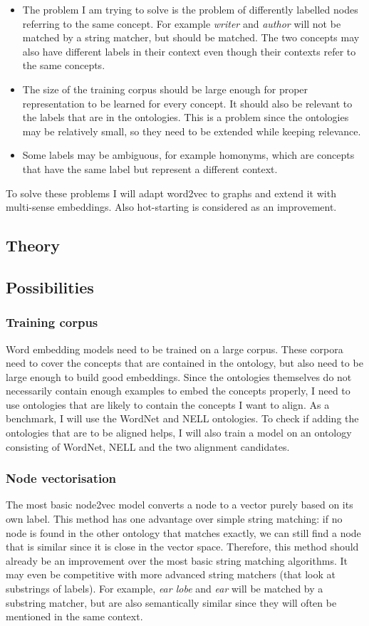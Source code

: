 \documentclass{article}
\begin{document}
 \begin{itemize}
  \item The problem I am trying to solve is the problem of differently labelled nodes referring to the same concept. For example \emph{writer} and \emph{author} will not be matched by a string matcher, but should be matched. The two concepts may also have different labels in their context even though their contexts refer to the same concepts.
  \item The size of the training corpus should be large enough for proper representation to be learned for every concept. It should also be relevant to the labels that are in the ontologies. This is a problem since the ontologies may be relatively small, so they need to be extended while keeping relevance.
  \item Some labels may be ambiguous, for example homonyms, which are concepts that have the same label but represent a different context.
 \end{itemize}
 
 To solve these problems I will adapt word2vec to graphs and extend it with multi-sense embeddings. Also hot-starting is considered as an improvement.
 
 \subsection{Theory}
 \subsection{Possibilities} %
  \subsubsection{Training corpus}
  Word embedding models need to be trained on a large corpus. These corpora need to cover the concepts that are contained in the ontology, but also need to be large enough to build good embeddings. Since the ontologies themselves do not necessarily contain enough examples to embed the concepts properly, I need to use ontologies that are likely to contain the concepts I want to align.
  As a benchmark, I will use the WordNet and NELL ontologies. To check if adding the ontologies that are to be aligned helps, I will also train a model on an ontology consisting of WordNet, NELL and the two alignment candidates.
  \subsubsection{Node vectorisation}
  The most basic node2vec model converts a node to a vector purely based on its own label. This method has one advantage over simple string matching: if no node is found in the other ontology that matches exactly, we can still find a node that is similar since it is close in the vector space. Therefore, this method should already be an improvement over the most basic string matching algorithms. It may even be competitive with more advanced string matchers (that look at substrings of labels). For example, \emph{ear lobe} and \emph{ear} will be matched by a substring matcher, but are also semantically similar since they will often be mentioned in the same context.
\end{document}
